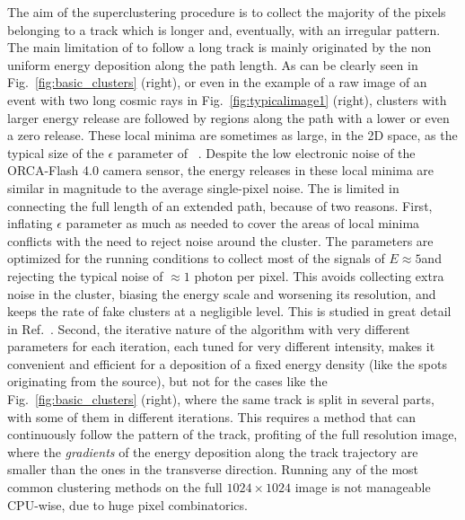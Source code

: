 The aim of the superclustering procedure is to collect the majority of
the pixels belonging to a track which is longer and, eventually, with
an irregular pattern. The main limitation of \idbscan to follow a long
track is mainly originated by the non uniform energy deposition along
the path length.  As can be clearly seen in
Fig.~\ref{fig:basic_clusters} (right), or even in the example of a raw
image of an event with two long cosmic rays in
Fig.~\ref{fig:typicalimage1} (right), clusters with larger energy
release are followed by regions along the path with a lower or even a
zero release.  These local minima are sometimes as large, in the 2D
space, as the typical size of the $\epsilon$ parameter of
\dbscan~\cite{dbscan}. Despite the low electronic noise of the
ORCA-Flash 4.0 camera sensor, the energy releases in these local
minima are similar in magnitude to the average single-pixel noise.
The \idbscan is limited in connecting the full length of an extended
path, because of two reasons. First, inflating $\epsilon$ parameter as
much as needed to cover the areas of local minima conflicts with the
need to reject noise around the cluster.  The \idbscan parameters are
optimized for the \lemon running conditions to collect most of the
signals of $E \approx 5$\keV and rejecting the typical noise of
$\approx 1$ photon per pixel. This avoids collecting extra noise in
the cluster, biasing the energy scale and worsening its resolution,
and keeps the rate of fake clusters at a negligible level.  This is
studied in great detail in Ref.~\cite{iDBSCAN}.  Second, the iterative
nature of the algorithm with very different parameters for each
iteration, each tuned for very different intensity, makes it
convenient and efficient for a deposition of a fixed energy density
(like the spots originating from the \fe source), but not for the
cases like the Fig.~\ref{fig:basic_clusters} (right), where the same
track is split in several parts, with some of them in different
iterations.  This requires a method that can continuously follow the
pattern of the track, profiting of the full resolution image, where
the {\it gradients} of the energy deposition along the track
trajectory are smaller than the ones in the transverse
direction. Running any of the most common clustering methods on the
full $1024\times1024$ image is not manageable CPU-wise, due to huge
pixel combinatorics.


